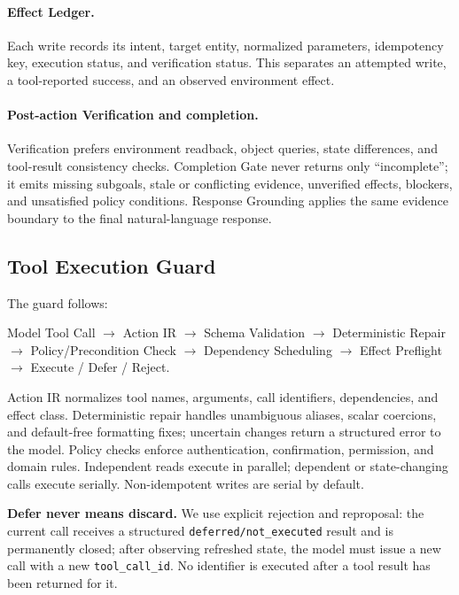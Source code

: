 \documentclass[10pt]{article}
\newcommand{\code}[1]{\texttt{#1}}
\begin{document}
\paragraph{Effect Ledger.}
Each write records its intent, target entity, normalized parameters, idempotency
key, execution status, and verification status. This separates an attempted write,
a tool-reported success, and an observed environment effect.

\paragraph{Post-action Verification and completion.}
Verification prefers environment readback, object queries, state differences, and
tool-result consistency checks. Completion Gate never returns only ``incomplete'';
it emits missing subgoals, stale or conflicting evidence, unverified effects,
blockers, and unsatisfied policy conditions. Response Grounding applies the same
evidence boundary to the final natural-language response.

\subsection{Tool Execution Guard}

The guard follows:
\begin{center}
\small Model Tool Call $\rightarrow$ Action IR $\rightarrow$ Schema Validation
$\rightarrow$ Deterministic Repair $\rightarrow$ Policy/Precondition Check
$\rightarrow$ Dependency Scheduling $\rightarrow$ Effect Preflight
$\rightarrow$ Execute / Defer / Reject.
\end{center}

Action IR normalizes tool names, arguments, call identifiers, dependencies, and
effect class. Deterministic repair handles unambiguous aliases, scalar coercions,
and default-free formatting fixes; uncertain changes return a structured error to
the model. Policy checks enforce authentication, confirmation, permission, and
domain rules. Independent reads execute in parallel; dependent or state-changing
calls execute serially. Non-idempotent writes are serial by default.

\textbf{Defer never means discard.} We use explicit rejection and reproposal:
the current call receives a structured \code{deferred/not\_executed} result and
is permanently closed; after observing refreshed state, the model must issue a
new call with a new \code{tool\_call\_id}. No identifier is executed after a tool
result has been returned for it.
\end{document}
